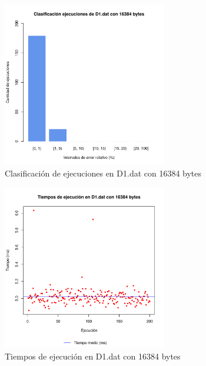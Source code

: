 \begin{figure}[h!]
    \centering
        \includegraphics[width=0.64\textwidth]{../figs/D1/plot_count_16384.pdf}
        \caption{Clasificación de ejecuciones en D1.dat con 16384 bytes}
    \label{figura:D1_count_16384}
\end{figure}

\begin{figure}[h!]
    \centering
        \includegraphics[width=0.64\textwidth]{../figs/D1/plot_time_16384.pdf}
        \caption{Tiempos de ejecución en D1.dat con 16384 bytes}
    \label{figura:D1_time_16384}
\end{figure}

\clearpage
